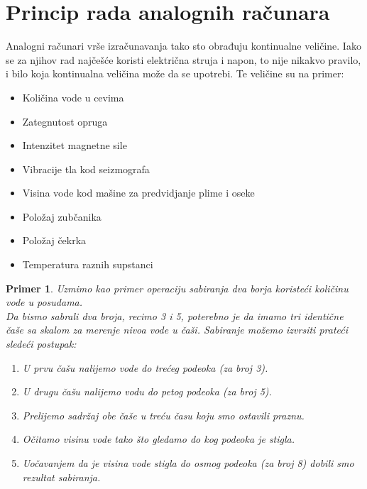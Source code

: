 \documentclass[a4paper]{article}
\newtheorem{primer}{Primer}[section]
\begin{document}
{\section{Princip rada analognih računara}
Analogni računari vrše izračunavanja tako sto obrađuju kontinualne veličine. Iako se  za njihov rad najčešće koristi električna struja i napon, to nije nikakvo pravilo, i bilo koja kontinualna veličina može da se upotrebi. Te veličine su na primer: \begin{itemize}
				\item Količina vode u cevima
				\item Zategnutost opruga
				\item Intenzitet magnetne sile
				\item Vibracije tla kod seizmografa
				\item Visina vode kod mašine za predvidjanje plime i oseke \cite{tide}
				\item Položaj zubčanika
				\item Položaj čekrka
				\item Temperatura raznih supstanci
			\end{itemize}
			
\bigskip

    \begin{primer}
    Uzmimo kao primer operaciju sabiranja dva borja koristeći količinu vode u posudama.\\
    Da bismo sabrali dva broja, recimo 3 i 5, poterebno je da imamo tri identične čaše sa skalom za merenje nivoa vode u čaši. Sabiranje možemo izvrsiti prateći sledeći postupak:\begin{enumerate}
        \item U prvu čašu nalijemo vode do trećeg podeoka (za broj 3).
        \item U drugu čašu nalijemo vodu do petog podeoka (za broj 5).
        \item Prelijemo sadržaj obe čaše u treću času koju smo ostavili praznu.
        \item Očitamo visinu vode tako što gledamo do kog podeoka je stigla.
        \item Uočavanjem da je visina vode stigla do osmog podeoka (za broj 8) dobili smo rezultat sabiranja.
    \end{enumerate}
    \end{primer}
    
\bigskip

}
\end{document}

